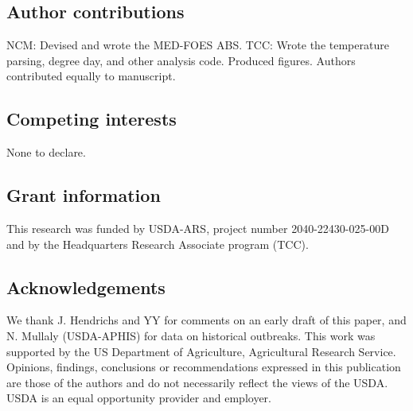 \documentclass[10pt,a4paper,twocolumn]{article}
\begin{document}




\subsection*{Author contributions}
NCM: Devised and wrote the MED-FOES ABS.
TCC: Wrote the temperature parsing, degree day, and other analysis code. Produced figures.
Authors contributed equally to manuscript.

\subsection*{Competing interests}
None to declare.

\subsection*{Grant information}
This research was funded by USDA-ARS, project number 2040-22430-025-00D and by the Headquarters 
Research Associate program (TCC).

\subsection*{Acknowledgements}
We thank J. Hendrichs and YY for comments on an early draft of this paper, and N. Mullaly (USDA-APHIS) for 
data on historical outbreaks. This work was supported by the US Department of Agriculture, Agricultural Research Service. Opinions, findings, conclusions or recommendations expressed in this publication are those of the authors and do not necessarily reflect the views of the USDA. USDA is an equal opportunity provider and employer.

{\small
}

\end{document}
